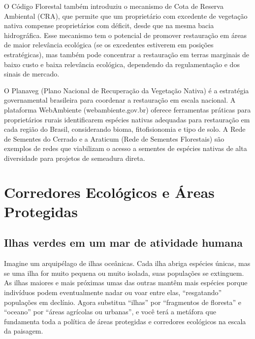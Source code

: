 \documentclass[
  portuguese,
  11pt,
  a4paper,
  open=any]{scrbook}
\begin{document}
O Código Florestal também introduziu o mecanismo de Cota de Reserva
Ambiental (CRA), que permite que um proprietário com excedente de
vegetação nativa compense proprietários com déficit, desde que na mesma
bacia hidrográfica. Esse mecanismo tem o potencial de promover
restauração em áreas de maior relevância ecológica (se os excedentes
estiverem em posições estratégicas), mas também pode concentrar a
restauração em terras marginais de baixo custo e baixa relevância
ecológica, dependendo da regulamentação e dos sinais de mercado.

\begin{tcolorbox}[enhanced jigsaw, colbacktitle=quarto-callout-tip-color!10!white, coltitle=black, opacityback=0, breakable, left=2mm, colback=white, bottomtitle=1mm, toptitle=1mm, titlerule=0mm, arc=.35mm, opacitybacktitle=0.6, leftrule=.75mm, colframe=quarto-callout-tip-color-frame, title=\textcolor{quarto-callout-tip-color}{\faLightbulb}\hspace{0.5em}{Para aprofundar}, rightrule=.15mm, bottomrule=.15mm, toprule=.15mm]

O Planaveg (Plano Nacional de Recuperação da Vegetação Nativa) é a
estratégia governamental brasileira para coordenar a restauração em
escala nacional. A plataforma WebAmbiente (webambiente.gov.br) oferece
ferramentas práticas para proprietários rurais identificarem espécies
nativas adequadas para restauração em cada região do Brasil,
considerando bioma, fitofisionomia e tipo de solo. A Rede de Sementes do
Cerrado e a Araticum (Rede de Sementes Florestais) são exemplos de redes
que viabilizam o acesso a sementes de espécies nativas de alta
diversidade para projetos de semeadura direta.

\end{tcolorbox}

\chapter{Corredores Ecológicos e Áreas Protegidas}\label{sec-corredores}

\section{Ilhas verdes em um mar de atividade
humana}\label{ilhas-verdes-em-um-mar-de-atividade-humana}

Imagine um arquipélago de ilhas oceânicas. Cada ilha abriga espécies
únicas, mas se uma ilha for muito pequena ou muito isolada, suas
populações se extinguem. As ilhas maiores e mais próximas umas das
outras mantêm mais espécies porque indivíduos podem eventualmente nadar
ou voar entre elas, ``resgatando'' populações em declínio. Agora
substitua ``ilhas'' por ``fragmentos de floresta'' e ``oceano'' por
``áreas agrícolas ou urbanas'', e você terá a metáfora que fundamenta
toda a política de áreas protegidas e corredores ecológicos na escala da
paisagem.
\end{document}
